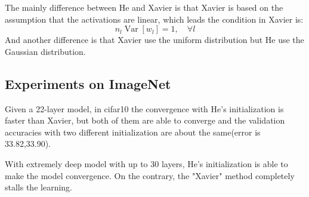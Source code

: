 The mainly difference between He and Xavier is that Xavier  is based on the assumption that the activations are linear, which leads the condition in Xavier is:
\begin{equation}\label{Xavier}
 n_{l} \operatorname{Var}\left[w_{l}\right]=1, \quad \forall l
\end{equation}
And another difference is that Xavier use the uniform distribution but He use the Gaussian distribution.
\subsection{Experiments on ImageNet}
Given a 22-layer model, in cifar10 the convergence with He's initialization is faster than Xavier, but both of them are able to converge and the validation accuracies with two different initialization are about the same(error is 33.82,33.90).

With extremely deep model with up to 30 layers, He's initialization is able to make the model convergence. On the contrary, the "Xavier" method completely stalls the learning.


